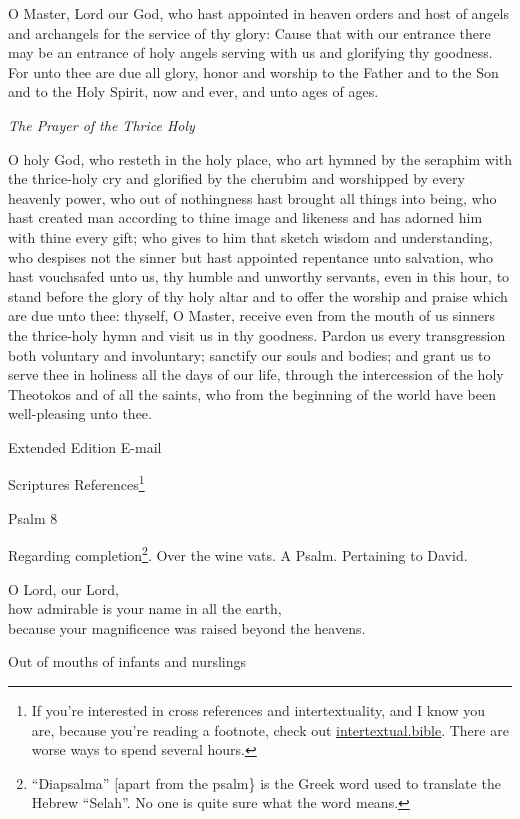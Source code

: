 \documentclass[
]{article}
\begin{document}
O Master, Lord our God, who hast appointed in heaven orders and host of
angels and archangels for the service of thy glory: Cause that with our
entrance there may be an entrance of holy angels serving with us and
glorifying thy goodness. For unto thee are due all glory, honor and
worship to the Father and to the Son and to the Holy Spirit, now and
ever, and unto ages of ages.

\emph{The Prayer of the Thrice Holy}

O holy God, who resteth in the holy place, who art hymned by the
seraphim with the thrice-holy cry and glorified by the cherubim and
worshipped by every heavenly power, who out of nothingness hast brought
all things into being, who hast created man according to thine image and
likeness and has adorned him with thine every gift; who gives to him
that sketch wisdom and understanding, who despises not the sinner but
hast appointed repentance unto salvation, who hast vouchsafed unto us,
thy humble and unworthy servants, even in this hour, to stand before the
glory of thy holy altar and to offer the worship and praise which are
due unto thee: thyself, O Master, receive even from the mouth of us
sinners the thrice-holy hymn and visit us in thy goodness. Pardon us
every transgression both voluntary and involuntary; sanctify our souls
and bodies; and grant us to serve thee in holiness all the days of our
life, through the intercession of the holy Theotokos and of all the
saints, who from the beginning of the world have been well-pleasing unto
thee.

Extended Edition E-mail

Scriptures References\footnote{If you're interested in cross references
  and intertextuality, and I know you are, because you're reading a
  footnote, check out
  \href{http://intertextual.bible}{\ul{intertextual.bible}}. There are
  worse ways to spend several hours.}

Psalm 8

Regarding completion\footnote{``Diapsalma'' {[}apart from the psalm\} is
  the Greek word used to translate the Hebrew ``Selah''. No one is quite
  sure what the word means.}. Over the wine vats. A Psalm. Pertaining to
David.

O Lord, our Lord,\\
how admirable is your name in all the earth,\\
because your magnificence was raised beyond the heavens.

Out of mouths of infants and nurslings
\end{document}
